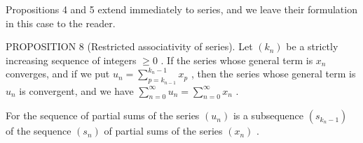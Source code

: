 Propositions 4 and 5 extend immediately to series, and we leave their formulation in this case to the reader.

PROPOSITION 8 (Restricted associativity of series). Let \((k_n)\) be a strictly increasing sequence of integers \(\geqslant 0\) . If the series whose general term is \(x_n\) converges, and if we put \(u_n = \sum_{p=k_{n-1}}^{k_n-1} x_p\) , then the series whose general term is \(u_n\) is convergent, and we have \(\sum_{n=0}^{\infty} u_n = \sum_{n=0}^{\infty} x_n\) .

For the sequence of partial sums of the series \((u_{n})\) is a subsequence \((s_{k_{n}-1})\) of the sequence \((s_{n})\) of partial sums of the series \((x_{n})\) .

